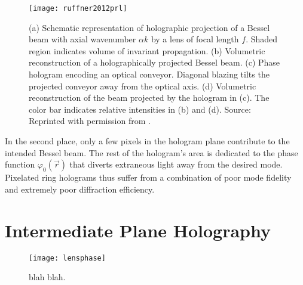 \begin{figure}[t!]
  \centering
  \texttt{[image: ruffner2012prl]}
  \caption{(a) Schematic representation of holographic projection of a Bessel beam with axial wavenumber $\alpha k$ by a lens of focal length $f$. Shaded region indicates volume of invariant propagation. (b) Volumetric reconstruction of a holographically projected Bessel beam. (c) Phase hologram encoding an optical conveyor. Diagonal blazing tilts the projected conveyor away from the optical axis. (d) Volumetric reconstruction of the beam projected by the hologram in (c). The color bar indicates relative intensities in (b) and (d). Source: Reprinted with permission from \cite{ruffner12a}.}
  \label{fig:previous bessel hologram}
\end{figure}


In the second place, only a few pixels in
the hologram plane contribute to the intended Bessel beam.
The rest of the hologram's area is dedicated to the
phase function $\varphi_0(\vec{r})$ that diverts
extraneous light away from the desired mode.
Pixelated ring holograms thus suffer from a combination of
poor mode fidelity and extremely poor diffraction efficiency.






\section{Intermediate Plane Holography}



\begin{figure}[t!]
  \centering
  \texttt{[image: lensphase]}
  \caption{blah blah.}
  \label{fig:blah blah}
\end{figure}



